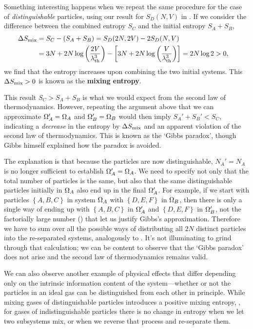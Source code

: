 Something interesting happens when we repeat the same procedure for the case of \textit{distinguishable} particles, using our result for $S_D(N, V)$ in .
If we consider the difference between the combined entropy $S_C$ and the initial entropy $S_A + S_B$,
\begin{align}
  \Delta S_{\mathrm{mix}} & = S_C - (S_A + S_B) = S_D(2N, 2V) - 2S_D(N, V) \cr
                       & = 3N + 2N \log\left(\frac{2V}{\lambda_{\mathrm{th}}^3}\right) - \left[3N + 2N \log\left(\frac{V}{\lambda_{\mathrm{th}}^3}\right)\right] = 2N\log 2 > 0, \label{eq:mixing_entropy}
\end{align}
we find that the entropy increases upon combining the two initial systems.
This $\Delta S_{\mathrm{mix}} > 0$ is known as the \textbf{mixing entropy}.

This result $S_C > S_A + S_B$ is what we would expect from the second law of thermodynamics.
However, repeating the argument above that we can approximate $\Omega_A' = \Omega_A$ and $\Omega_B' = \Omega_B$ would then imply $S_A' + S_B' < S_C$, indicating a \textit{decrease} in the entropy by $\Delta S_{\mathrm{mix}}$ and an apparent violation of the second law of thermodynamics.
This is known as the `Gibbs paradox', though Gibbs himself explained how the paradox is avoided.

The explanation is that because the particles are now distinguishable, $N_A' = N_A$ is no longer sufficient to establish $\Omega_A' = \Omega_A$.
We need to specify not only that the total number of particles is the same, but also that the same distinguishable particles initially in $\Omega_A$ also end up in the final $\Omega_A'$.
For example, if we start with particles $\left\{A, B, C\right\}$ in system $\Omega_A$ with $\left\{D, E, F\right\}$ in $\Omega_B$, then there is only a single way of ending up with $\left\{A, B, C\right\}$ in $\Omega_A'$ and $\left\{D, E, F\right\}$ in $\Omega_B'$, not the factorially large number () that let us justify Gibbs's approximation. %
Therefore we have to sum over all the possible ways of distributing all $2N$ distinct particles into the re-separated systems, analogously to .
It's not illuminating to grind through that calculation; we can be content to observe that the `Gibbs paradox' does not arise and the second law of thermodynamics remains valid.

We can also observe another example of physical effects that differ depending only on the intrinsic information content of the system---whether or not the particles in an ideal gas can be distinguished from each other in principle.
While mixing gases of distinguishable particles introduces a positive mixing entropy, , for gases of indistinguishable particles there is no change in entropy when we let two subsystems mix, or when we reverse that process and re-separate them.



